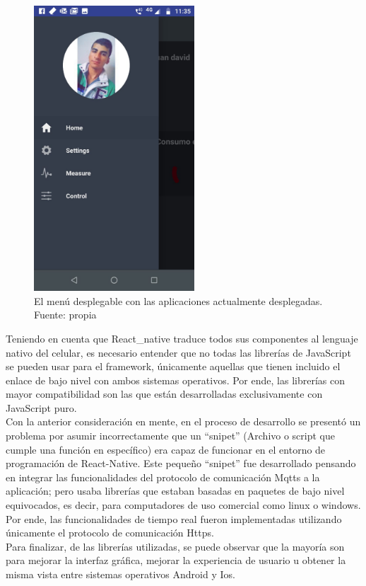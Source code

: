 \begin{figure}[htbp]
	\centerline{\includegraphics[width=6cm]{./figuras/mobile_menu.jpeg}}
	\caption{El menú desplegable con las aplicaciones actualmente desplegadas. Fuente: propia}
	\label{fig_17}
\end{figure}
Teniendo en cuenta que React\_native traduce todos sus componentes al lenguaje nativo del celular, es necesario entender que no todas las librerías de JavaScript se pueden usar para el framework, únicamente aquellas que tienen incluido el enlace de bajo nivel con ambos sistemas operativos. Por ende, las librerías con mayor compatibilidad son las que están desarrolladas exclusivamente con JavaScript puro. 
\vspace{0.5cm}\\
Con la anterior consideración en mente, en el proceso de desarrollo se presentó un problema por asumir incorrectamente que un ``snipet'' (Archivo o script que cumple una función en específico) era capaz de funcionar en el entorno de programación de React-Native. Este pequeño ``snipet'' fue desarrollado pensando en integrar las funcionalidades del protocolo de comunicación Mqtts a la aplicación; pero usaba librerías que estaban basadas en paquetes de bajo nivel equivocados, es decir, para computadores de uso comercial como linux o windows. Por ende, las funcionalidades de tiempo real fueron implementadas utilizando únicamente el protocolo de comunicación Https.
\vspace{0.5cm}\\
Para finalizar, de las librerías utilizadas, se puede observar que la mayoría son para mejorar la interfaz gráfica, mejorar la experiencia de usuario u obtener la misma vista entre sistemas operativos Android y Ios.

